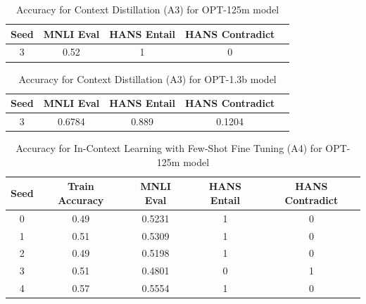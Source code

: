 \documentclass[10pt,twocolumn,letterpaper]{article}
\begin{document}
				
	
	\begin{table}[h!]
	\begin{center}
	\begin{tabular}{|c|c|c|c|c|}
	\hline
	\textbf{Seed} & \textbf{MNLI Eval} & \textbf{HANS Entail} & \textbf{HANS Contradict} \\
	\hline
	\hline
	3 & 0.52 & 1 & 0 \\
	\hline
	\end{tabular}
	\end{center}
	\caption{Accuracy for Context Distillation (A3) for OPT-125m model}
	\end{table}
	
	\begin{table}[h!]
	\begin{center}
	\begin{tabular}{|c|c|c|c|c|}
	\hline
	\textbf{Seed} & \textbf{MNLI Eval} & \textbf{HANS Entail} & \textbf{HANS Contradict} \\
	\hline
	\hline
	3 & 0.6784 & 0.889 & 0.1204 \\
	\hline
	\end{tabular}
	\end{center}
	\caption{Accuracy for Context Distillation (A3) for OPT-1.3b model}
	\end{table}
	
					
					
	
	\begin{table}[h!]
	\begin{center}
	\begin{tabular}{|c|c|c|c|c|}
	\hline
	\textbf{Seed} & \textbf{Train Accuracy} & \textbf{MNLI Eval} & \textbf{HANS Entail} & \textbf{HANS Contradict} \\
	\hline
	\hline
	0 & 0.49 & 0.5231 & 1 & 0 \\
	1 & 0.51 & 0.5309 & 1 & 0 \\
	2 & 0.49 & 0.5198 & 1 & 0 \\
	3 & 0.51 & 0.4801 & 0 & 1 \\
	4 & 0.57 & 0.5554 & 1 & 0 \\
	\hline
	\end{tabular}
	\end{center}
	\caption{Accuracy for In-Context Learning with Few-Shot Fine Tuning (A4) for OPT-125m model}
	\end{table}
	
\end{document}
